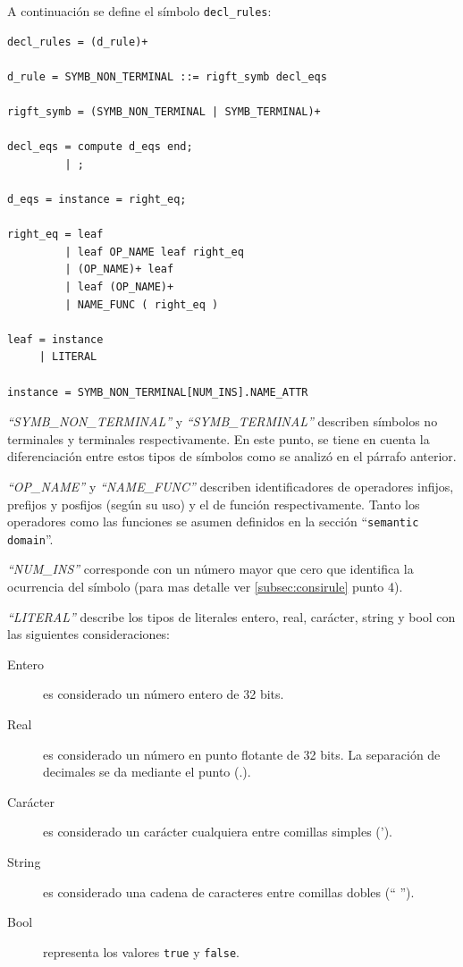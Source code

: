 A continuación se define el símbolo \texttt{decl\_rules}:

\begin{lstlisting}[frame=shadowbox, rulesepcolor=\color{azul}, language=specmag]
decl_rules = (d_rule)+ 

d_rule = SYMB_NON_TERMINAL ::= rigft_symb decl_eqs

rigft_symb = (SYMB_NON_TERMINAL | SYMB_TERMINAL)+

decl_eqs = compute d_eqs end;
         | ;

d_eqs = instance = right_eq;

right_eq = leaf
         | leaf OP_NAME leaf right_eq
         | (OP_NAME)+ leaf
         | leaf (OP_NAME)+
         | NAME_FUNC ( right_eq ) 

leaf = instance
     | LITERAL

instance = SYMB_NON_TERMINAL[NUM_INS].NAME_ATTR
\end{lstlisting}
\vspace{0.3cm}

\textit{``SYMB\_NON\_TERMINAL''} y \textit{``SYMB\_TERMINAL''} describen símbolos no terminales y terminales respectivamente. En este punto, se tiene en cuenta la diferenciación entre estos tipos de símbolos como se analizó en el párrafo anterior.
 
\textit{``OP\_NAME''} y  \textit{``NAME\_FUNC''} describen identificadores de operadores infijos, prefijos y posfijos (según su uso) y el de función respectivamente. Tanto los operadores como las funciones se asumen definidos en la sección ``\texttt{semantic domain}''.

\textit{``NUM\_INS''} corresponde con un número mayor que cero que identifica la ocurrencia del símbolo (para mas detalle ver \ref{subsec:consirule} punto 4).

\textit{``LITERAL''} describe los tipos de literales entero, real, carácter, string y bool con las siguientes consideraciones:

\begin{description}
\item [Entero] es considerado un número entero de 32 bits. 
\item [Real] es considerado un número en punto flotante de 32 bits. La separación de decimales se da mediante el punto (.).
\item [Carácter] es considerado un carácter cualquiera entre comillas simples (').
\item [String] es considerado una cadena de caracteres entre comillas dobles (`` '').
\item [Bool] representa los valores \texttt{true} y \texttt{false}.
\end{description}

